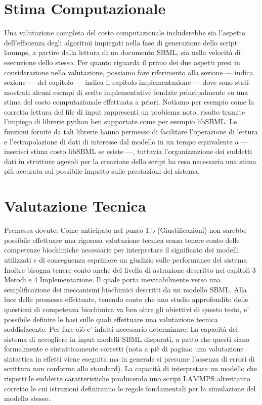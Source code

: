 \documentclass[Lau, oneside]{sapthesis}
\begin{document}
\section{Stima Computazionale}
\label{sec:stcomp}
Una valutazione completa del costo computazionale includerebbe sia l'aspetto dell'efficienza degli algoritmi impiegati nella fase di generazione dello script lammps, a partire dalla lettura di un documento SBML, sia nella velocità di esecuzione dello stesso. Per quanto riguarda il primo dei due aspetti presi in considerazione nella valutazione, possiamo fare riferimento alla sezione --- indica sezione --- del capitolo --- indica il capitolo implementazione --- dove sono stati mostrati alcuni esempi di scelte implementative fondate  principalmente su una stima del costo computazionale effettuata a priori. Notiamo per esempio come la corretta lettura del file di input rappresenti un problema noto, risolto tramite l'impiego di librerie python ben supportate come per esempio libSBML. Le funzioni fornite da tali librerie hanno permesso di facilitare l'operazione di lettura e l'estrapolazione di dati di interesse dal modello in un tempo equivalente a --- inserisci stima costo libSBML se esiste ---, tuttavia l'organizzazione dei suddetti dati in strutture agevoli per la creazione dello script ha reso necessaria una stima più accurata sul possibile impatto sulle prestazioni del sistema. 

\newpage
\section{Valutazione Tecnica}
\label{sec:valtc}
Premessa dovute:
Come anticipato nel punto 1.b (Giustificazioni) non sarebbe possibile effettuare una rigorosa valutazione tecnica senza tenere conto delle competenze biochimiche necessarie per interpretare il significato dei modelli utilizzati e di conseguenza esprimere un giudizio sulle performance del sistema
Inoltre bisogna tenere conto anche del livello di astrazione descritto nei capitoli 3 Metodi e 4 Implementazione. Il quale porta inevitabilmente verso una semplificazione dei meccanismi biochimici descritti da un modello SBML.
Alla luce delle premesse effettuate, tenendo conto che uno studio approfondito delle questioni di competenza biochimica va ben oltre gli obiettivi di questo testo, e’ possibile definire le basi sulle quali effettuare una valutazione tecnica soddisfacente. Per fare ciò e’ infatti necessario determinare:
La capacità del sistema di accogliere in input modelli SBML disparati, a patto che questi siano formalmente e sintatticamente corretti (nota a piè di pagina: una valutazione sintattica in effetti viene eseguita ma in generale si presume l’assenza di errori di scrittura non conforme allo standard).
La capacità di interpretare un  modello che rispetti le suddette caratteristiche producendo uno script LAMMPS altrettanto corretto le cui istruzioni definiranno le regole fondamentali per la simulazione del modello stesso.
\end{document}
